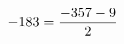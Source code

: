 \documentclass[preview]{standalone}
\begin{document}
\begin{align*}
\special{dvisvgm:raw <g id='unique000'>}-183 = \frac{-357 - 9}{2}\special{dvisvgm:raw </g>}
\end{align*}
\end{document}

